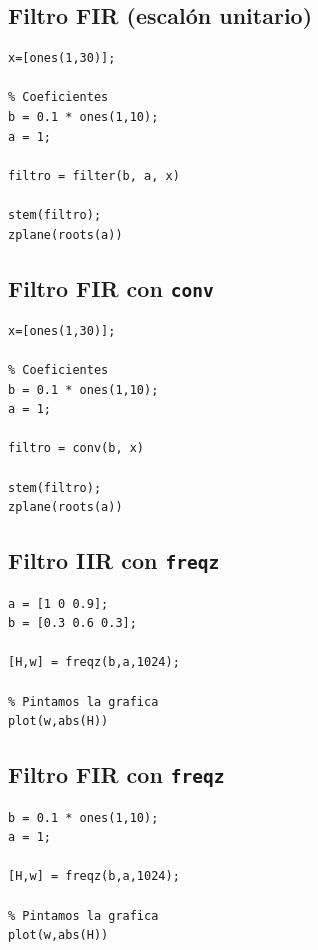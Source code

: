 \documentclass[11pt,a4paper]{article}
\begin{document}
\subsection{Filtro FIR (escalón unitario)}
\label{code6}

\begin{lstlisting}[frame=single]
% Se define el array con los pulsos
x=[ones(1,30)];

% Coeficientes
b = 0.1 * ones(1,10);
a = 1;

filtro = filter(b, a, x)

stem(filtro);
zplane(roots(a))
\end{lstlisting}

\subsection{Filtro FIR con \texttt{conv}}
\label{code7}

\begin{lstlisting}[frame=single]
% Se define el array con los pulsos
x=[ones(1,30)];

% Coeficientes
b = 0.1 * ones(1,10);
a = 1;

filtro = conv(b, x)

stem(filtro);
zplane(roots(a))
\end{lstlisting}

\subsection{Filtro IIR con \texttt{freqz}}
\label{code8}

\begin{lstlisting}[frame=single]
% Se definen los coeficientes de las ecuaciones en diferencias
a = [1 0 0.9];
b = [0.3 0.6 0.3];

[H,w] = freqz(b,a,1024);

% Pintamos la grafica
plot(w,abs(H))
\end{lstlisting}

\subsection{Filtro FIR con \texttt{freqz}}
\label{code9}

\begin{lstlisting}[frame=single]
% Se definen los coeficientes de las ecuaciones en diferencias
b = 0.1 * ones(1,10);
a = 1;

[H,w] = freqz(b,a,1024);

% Pintamos la grafica
plot(w,abs(H))
\end{lstlisting}
\end{document}
